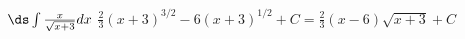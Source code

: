 {$\ds \int \frac{x}{\sqrt{x+3}} dx $}
{$\frac23(x+3)^{3/2}-6(x+3)^{1/2}+C = \frac{2}{3} (x-6) \sqrt{x+3}+C$}